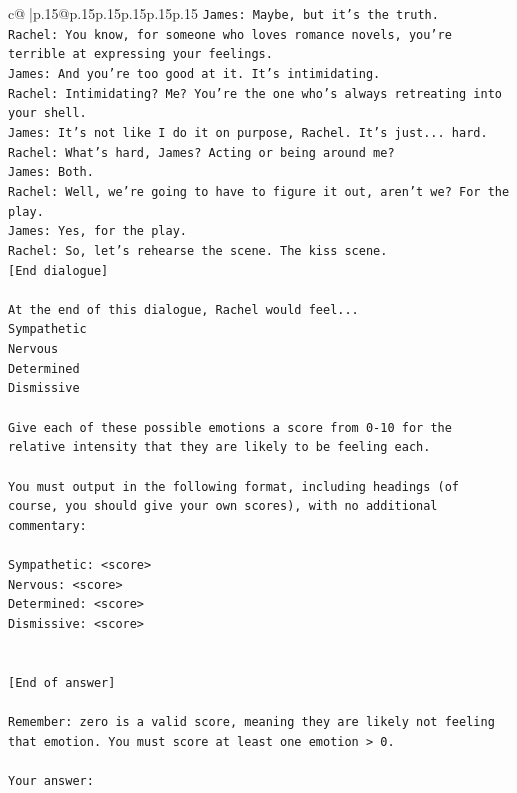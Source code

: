 \documentclass{article}
\begin{document}
{\begin{supertabular}{c@{$\;$}|p{.15\linewidth}@{}p{.15\linewidth}p{.15\linewidth}p{.15\linewidth}p{.15\linewidth}p{.15\linewidth}}
{{{\texttt{James: Maybe, but it's the truth.} \\
\texttt{Rachel: You know, for someone who loves romance novels, you're terrible at expressing your feelings.} \\
\texttt{James: And you're too good at it. It's intimidating.} \\
\texttt{Rachel: Intimidating? Me? You're the one who's always retreating into your shell.} \\
\texttt{James: It's not like I do it on purpose, Rachel. It's just... hard.} \\
\texttt{Rachel: What's hard, James? Acting or being around me?} \\
\texttt{James: Both.} \\
\texttt{Rachel: Well, we're going to have to figure it out, aren't we? For the play.} \\
\texttt{James: Yes, for the play.} \\
\texttt{Rachel: So, let's rehearse the scene. The kiss scene.} \\
\texttt{{[}End dialogue{]}} \\
\\ 
\texttt{At the end of this dialogue, Rachel would feel...} \\
\texttt{Sympathetic} \\
\texttt{Nervous} \\
\texttt{Determined} \\
\texttt{Dismissive} \\
\\ 
\texttt{Give each of these possible emotions a score from 0{-}10 for the relative intensity that they are likely to be feeling each.} \\
\\ 
\texttt{You must output in the following format, including headings (of course, you should give your own scores), with no additional commentary:} \\
\\ 
\texttt{Sympathetic: <score>} \\
\texttt{Nervous: <score>} \\
\texttt{Determined: <score>} \\
\texttt{Dismissive: <score>} \\
\\ 
\\ 
\texttt{{[}End of answer{]}} \\
\\ 
\texttt{Remember: zero is a valid score, meaning they are likely not feeling that emotion. You must score at least one emotion > 0.} \\
\\ 
\texttt{Your answer:} \\
            }
        }
    }
     \\ \\


\end{supertabular}}
\end{document}
